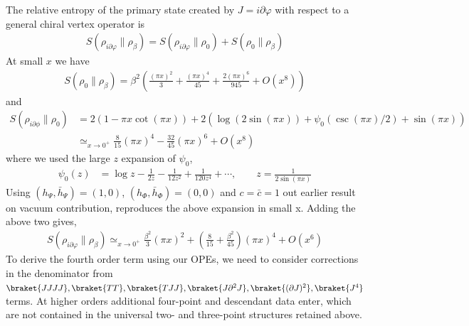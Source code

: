 \documentclass[11pt]{article}
\newcommand{\p}{\partial}
\newcommand{\nn}{\nonumber}
\newcommand{\lb}{\left(}
\newcommand{\rb}{\right)}
\begin{document}
  The relative entropy of the primary state created by $J=i\p\varphi$ with respect to a general chiral vertex operator is \cite{Calabrese_2014,Essler_2013, Nakagawa_2017}
  \begin{align}
  S(\rho_{i\p\varphi}\|\rho_\beta)=S(\rho_{i\p\varphi}\|\rho_0)+S(\rho_0\|\rho_\beta)
  \end{align}
At small $x$ we have
  \begin{align}
      S(\rho_0\| \rho_\beta) = \beta^2\lb \frac{(\pi x)^2}{3} + \frac{(\pi x)^4}{45}+\frac{2(\pi x)^6}{945} + O(x^8)\rb
  \end{align}
  and
  \begin{align}
      S(\rho_{i\partial\phi}\|\rho_0)&=2(1-\pi x \cot(\pi x))+2\lb \log(2\sin(\pi x))+\psi_0(\csc(\pi x)/2)+\sin(\pi x)\rb\nn\\
      &\simeq_{x \to 0^+} \frac{8}{15}(\pi x)^4 -\frac{32}{45}\lb \pi x \rb^6  + O(x^8)
  \end{align}
  where we used the large $z$ expansion of $\psi_0$,
  \begin{align}
      \psi_0(z) &= \log z - \frac{1}{2z} - \frac{1}{12z^2} + \frac{1}{120z^4} + \cdots, \qquad 
      z = \frac{1}{2\sin(\pi x)}
  \end{align}
  Using  $(h_\Psi,\bar h_\Psi) = (1,0)$, $(h_\Phi,\bar h_\Phi) = (0,0)$ and $c = \bar c = 1$ out earlier result on vacuum contribution, reproduces the above expansion in small x.
  Adding the above two gives,
  \begin{align}
      S(\rho_{i\p \varphi}\| \rho_\beta) \simeq_{x \to 0^+} \frac{\beta^2}{3}(\pi x)^2 + \lb\frac{8}{15} + \frac{\beta^2}{45}\rb(\pi x)^4 + O(x^6)
  \end{align}
    To derive the fourth order term using our OPEs, we need to consider corrections in the denominator from $\braket{JJJJ}, \braket{TT},\braket{TJJ}, \braket{J \p^2 J}, \braket{(\p J)^2}, \braket{J^4}$ terms. At higher orders additional four-point and descendant data enter, which are not contained in the universal two- and three-point structures retained above. 
  
\end{document}
